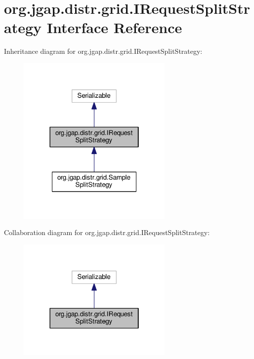 \hypertarget{interfaceorg_1_1jgap_1_1distr_1_1grid_1_1_i_request_split_strategy}{\section{org.\-jgap.\-distr.\-grid.\-I\-Request\-Split\-Strategy Interface Reference}
\label{interfaceorg_1_1jgap_1_1distr_1_1grid_1_1_i_request_split_strategy}
}


Inheritance diagram for org.\-jgap.\-distr.\-grid.\-I\-Request\-Split\-Strategy\-:
\nopagebreak
\begin{figure}[H]
\begin{center}
\leavevmode
\includegraphics[width=214pt]{interfaceorg_1_1jgap_1_1distr_1_1grid_1_1_i_request_split_strategy__inherit__graph}
\end{center}
\end{figure}


Collaboration diagram for org.\-jgap.\-distr.\-grid.\-I\-Request\-Split\-Strategy\-:
\nopagebreak
\begin{figure}[H]
\begin{center}
\leavevmode
\includegraphics[width=214pt]{interfaceorg_1_1jgap_1_1distr_1_1grid_1_1_i_request_split_strategy__coll__graph}
\end{center}
\end{figure}
